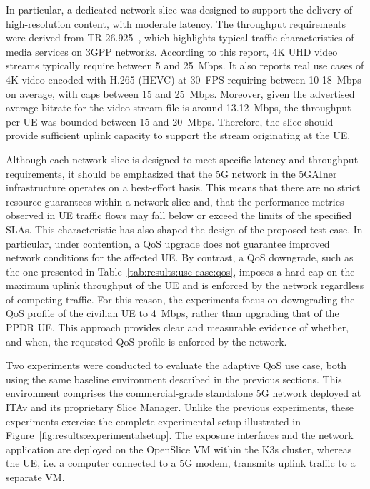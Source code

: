 In particular, a dedicated network slice was designed to support the delivery of high-resolution content, with moderate latency. The throughput requirements were derived from TR 26.925~\cite{TR26925}, which highlights typical traffic characteristics of media services on \acs{3GPP} networks. According to this report, 4K UHD video streams typically require between 5 and 25~Mbps. It also reports real use cases of 4K video encoded with H.265 (HEVC) at 30~\acs{FPS} requiring between 10-18~Mbps on average, with caps between 15 and 25~Mbps. Moreover, given the advertised average bitrate for the video stream file is around 13.12~Mbps, the throughput per \acs{UE} was bounded between 15 and 20~Mbps. Therefore, the slice should provide sufficient uplink capacity to support the stream originating at the \acs{UE}.

Although each network slice is designed to meet specific latency and throughput requirements, it should be emphasized that the \acs{5G} network in the 5GAIner infrastructure operates on a best-effort basis. This means that there are no strict resource guarantees within a network slice and, that the performance metrics observed in \ac{UE} traffic flows may fall below or exceed the limits of the specified \acsp{SLA}. This characteristic has also shaped the design of the proposed test case. In particular, under contention, a \acs{QoS} upgrade does not guarantee improved network conditions for the affected \acs{UE}. By contrast, a \acs{QoS} downgrade, such as the one presented in Table~\ref{tab:results:use-case:qos}, imposes a hard cap on the maximum uplink throughput of the \acs{UE} and is enforced by the network regardless of competing traffic. For this reason, the experiments focus on downgrading the \acs{QoS} profile of the civilian \acs{UE} to 4~Mbps, rather than upgrading that of the \acs{PPDR} \acs{UE}. This approach provides clear and measurable evidence of whether, and when, the requested \acs{QoS} profile is enforced by the network.

Two experiments were conducted to evaluate the adaptive \acs{QoS} use case, both using the same baseline environment described in the previous sections. This environment comprises the commercial-grade standalone \acs{5G} network deployed at \acs{ITAv} and its proprietary Slice Manager. Unlike the previous experiments, these experiments exercise the complete experimental setup illustrated in Figure~\ref{fig:results:experimentalsetup}. The exposure interfaces and the network application are deployed on the OpenSlice \acs{VM} within the K3s cluster, whereas the \acs{UE}, i.e. a computer connected to a \acs{5G} modem, transmits uplink traffic to a separate \acs{VM}.

